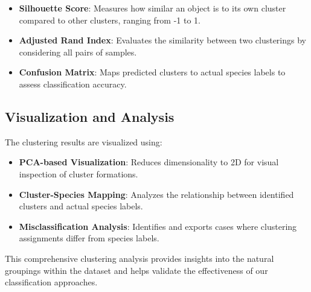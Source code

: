 \documentclass[a4paper,12pt]{report}
\begin{document}
\begin{itemize}
    \item \textbf{Silhouette Score}: Measures how similar an object is to its own cluster compared to other clusters, ranging from -1 to 1.
    \item \textbf{Adjusted Rand Index}: Evaluates the similarity between two clusterings by considering all pairs of samples.
    \item \textbf{Confusion Matrix}: Maps predicted clusters to actual species labels to assess classification accuracy.
\end{itemize}

\subsection{Visualization and Analysis}
The clustering results are visualized using:

\begin{itemize}
    \item \textbf{PCA-based Visualization}: Reduces dimensionality to 2D for visual inspection of cluster formations.
    \item \textbf{Cluster-Species Mapping}: Analyzes the relationship between identified clusters and actual species labels.
    \item \textbf{Misclassification Analysis}: Identifies and exports cases where clustering assignments differ from species labels.
\end{itemize}

This comprehensive clustering analysis provides insights into the natural groupings within the dataset and helps validate the effectiveness of our classification approaches.





\end{document}
